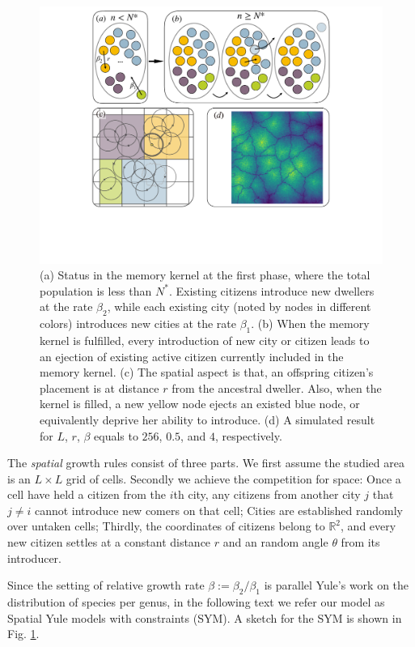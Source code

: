 \documentclass[reprint,unsortedaddress,amsmath,amssymb,aps,prl,showkeys]{revtex4-2}
\begin{document}
\begin{figure}
	\centering
	\includegraphics[width = 0.95\linewidth]{pics/sketchgood.pdf}
	\caption{(a) Status in the memory kernel at the first phase, where the total population is less than $N^*$. Existing citizens introduce new dwellers at the rate $\beta_2$, while each existing city (noted by nodes in different colors) introduces new cities at the rate $\beta_1$. (b) When the memory kernel is fulfilled, every introduction of new city or citizen leads to an ejection of existing active citizen currently included in the memory kernel. (c) The spatial aspect is that, an offspring citizen's placement is at distance $r$ from the ancestral dweller. Also, when the kernel is filled, a new yellow node ejects an existed blue node, or equivalently deprive her ability to introduce. (d) A simulated result for $L$, $r$, $\beta$ equals to $256$, $0.5$, and $4$, respectively.}
	\label{sketchpic}
\end{figure}

The \emph{spatial} growth rules consist of three parts. We first assume the studied area is an $L\times L$ grid of cells. Secondly we achieve the competition for space: Once a cell have held a citizen from the $i$th city, any citizens from another city $j$ that $j\ne i$ cannot introduce new comers on that cell; Cities are established randomly over untaken cells; Thirdly, the coordinates of citizens belong to $\mathbb{R}^2$, and every new citizen settles at a constant distance $r$ and an random angle $\theta$ from its introducer.

Since the setting of relative growth rate $\beta:= \beta_2/\beta_1$ is parallel Yule's work on the distribution of species per genus\cite{yule1925ii}, in the following text we refer our model as Spatial Yule models with constraints (SYM). A sketch for the SYM is shown in Fig. \ref{sketchpic}.
\end{document}
